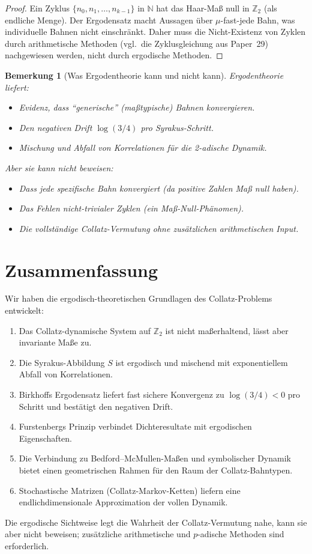 \documentclass[12pt,a4paper]{article}
\newtheorem{remark}[theorem]{Bemerkung}
\begin{document}
\begin{proof}
Ein Zyklus $\{n_0, n_1, \ldots, n_{k-1}\}$ in $\mathbb{N}$ hat das Haar-Maß null in
$\mathbb{Z}_2$ (als endliche Menge). Der Ergodensatz macht Aussagen über $\mu$-fast-jede
Bahn, was individuelle Bahnen nicht einschränkt. Daher muss die Nicht-Existenz von
Zyklen durch arithmetische Methoden (vgl.\ die Zyklusgleichung aus Paper~29) nachgewiesen
werden, nicht durch ergodische Methoden.
\end{proof}

\begin{remark}[Was Ergodentheorie kann und nicht kann]\label{rem:ergodisch_grenzen}
Ergodentheorie liefert:
\begin{itemize}
  \item Evidenz, dass ``generische'' (maßtypische) Bahnen konvergieren.
  \item Den negativen Drift $\log(3/4)$ pro Syrakus-Schritt.
  \item Mischung und Abfall von Korrelationen für die 2-adische Dynamik.
\end{itemize}
Aber sie kann nicht beweisen:
\begin{itemize}
  \item Dass jede \emph{spezifische} Bahn konvergiert (da positive Zahlen Maß null haben).
  \item Das Fehlen nicht-trivialer Zyklen (ein Maß-Null-Phänomen).
  \item Die vollständige Collatz-Vermutung ohne zusätzlichen arithmetischen Input.
\end{itemize}
\end{remark}

\section{Zusammenfassung}

Wir haben die ergodisch-theoretischen Grundlagen des Collatz-Problems entwickelt:
\begin{enumerate}
  \item Das Collatz-dynamische System auf $\mathbb{Z}_2$ ist nicht maßerhaltend,
        lässt aber invariante Maße zu.
  \item Die Syrakus-Abbildung $S$ ist ergodisch und mischend mit exponentiellem Abfall
        von Korrelationen.
  \item Birkhoffs Ergodensatz liefert fast sichere Konvergenz zu $\log(3/4) < 0$ pro
        Schritt und bestätigt den negativen Drift.
  \item Furstenbergs Prinzip verbindet Dichteresultate mit ergodischen Eigenschaften.
  \item Die Verbindung zu Bedford--McMullen-Maßen und symbolischer Dynamik bietet einen
        geometrischen Rahmen für den Raum der Collatz-Bahntypen.
  \item Stochastische Matrizen (Collatz-Markov-Ketten) liefern eine endlichdimensionale
        Approximation der vollen Dynamik.
\end{enumerate}
Die ergodische Sichtweise legt die Wahrheit der Collatz-Vermutung nahe, kann sie aber
nicht beweisen; zusätzliche arithmetische und $p$-adische Methoden sind erforderlich.
\end{document}
